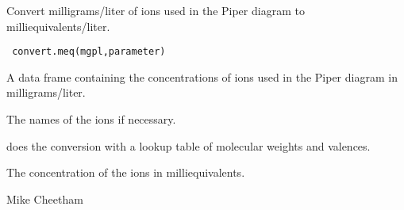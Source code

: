 \begin{Description}\relax
Convert milligrams/liter of ions used in the Piper diagram
to milliequivalents/liter.
\end{Description}
\begin{Usage}
\begin{verbatim}
 convert.meq(mgpl,parameter)
\end{verbatim}
\end{Usage}
\begin{Arguments}
\begin{ldescription}
\item[\code{mgpl}] A data frame containing the concentrations of ions used in the
Piper diagram in milligrams/liter.
\item[\code{parameter}] The names of the ions if necessary.
\end{ldescription}
\end{Arguments}
\begin{Details}\relax
{} does the conversion with a lookup table of molecular weights
and valences.
\end{Details}
\begin{Value}
The concentration of the ions in milliequivalents.
\end{Value}
\begin{Author}\relax
Mike Cheetham
\end{Author}
\begin{SeeAlso}\relax
{}
\end{SeeAlso}

